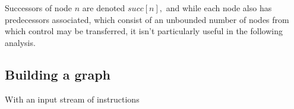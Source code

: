 \documentclass{article}
\begin{document}
Successors of node \(n\) are denoted \( \mathit{succ}[n], \)
and while each node also has predecessors associated, which consist of an  unbounded number of nodes from which control may be transferred, it isn't particularly useful in the following analysis.













\subsection{Building a graph}




With an input stream of instructions 

\end{document}
